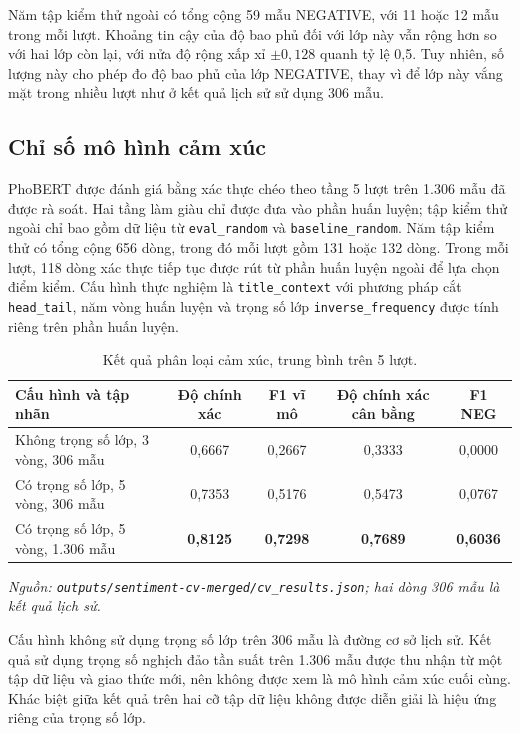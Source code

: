 \documentclass[12pt, a4paper, oneside]{report}
\begin{document}
Năm tập kiểm thử ngoài có tổng cộng 59 mẫu NEGATIVE, với 11 hoặc 12 mẫu trong mỗi lượt.
Khoảng tin cậy của độ bao phủ đối với lớp này vẫn rộng hơn so với hai lớp còn lại, với
nửa độ rộng xấp xỉ $\pm0{,}128$ quanh tỷ lệ 0,5. Tuy nhiên, số lượng này cho phép đo độ
bao phủ của lớp NEGATIVE, thay vì để lớp này vắng mặt trong nhiều lượt như ở kết quả
lịch sử sử dụng 306 mẫu.

\subsection{Chỉ số mô hình cảm xúc}
\label{sec:kq-sentiment-metrics}

PhoBERT được đánh giá bằng xác thực chéo theo tầng 5 lượt trên 1.306 mẫu đã được rà soát.
Hai tầng làm giàu chỉ được đưa vào phần huấn luyện; tập kiểm thử ngoài chỉ bao gồm dữ liệu
từ \texttt{eval\_random} và \texttt{baseline\_random}. Năm tập kiểm thử có tổng cộng 656
dòng, trong đó mỗi lượt gồm 131 hoặc 132 dòng. Trong mỗi lượt, 118 dòng xác thực tiếp tục
được rút từ phần huấn luyện ngoài để lựa chọn điểm kiểm. Cấu hình thực nghiệm là
\texttt{title\_context} với phương pháp cắt \texttt{head\_tail}, năm vòng huấn luyện và
trọng số lớp \texttt{inverse\_frequency} được tính riêng trên phần huấn luyện.

\begin{table}[H]
  \centering
  \caption{Kết quả phân loại cảm xúc, trung bình trên 5 lượt.}
  \label{tab:kq-sentiment}
  \begin{tabular}{l c c c c}
    \toprule
    Cấu hình và tập nhãn & Độ chính xác & F1 vĩ mô & Độ chính xác cân bằng & F1 NEG \\
    \midrule
    Không trọng số lớp, 3 vòng, 306 mẫu & 0,6667 & 0,2667 & 0,3333 & 0,0000 \\
    Có trọng số lớp, 5 vòng, 306 mẫu & 0,7353 & 0,5176 & 0,5473 & 0,0767 \\
    Có trọng số lớp, 5 vòng, 1.306 mẫu & \textbf{0,8125} & \textbf{0,7298} & \textbf{0,7689} & \textbf{0,6036} \\
    \bottomrule
  \end{tabular}
\noindent\textit{Nguồn: \texttt{outputs/sentiment-cv-merged/cv\_results.json}; hai dòng 306 mẫu là kết quả lịch sử.}
\end{table}

Cấu hình không sử dụng trọng số lớp trên 306 mẫu là đường cơ sở lịch sử. Kết quả sử dụng
trọng số nghịch đảo tần suất trên 1.306 mẫu được thu nhận từ một tập dữ liệu và giao thức
mới, nên không được xem là mô hình cảm xúc cuối cùng. Khác biệt giữa kết quả trên hai cỡ
tập dữ liệu không được diễn giải là hiệu ứng riêng của trọng số lớp.
\end{document}
